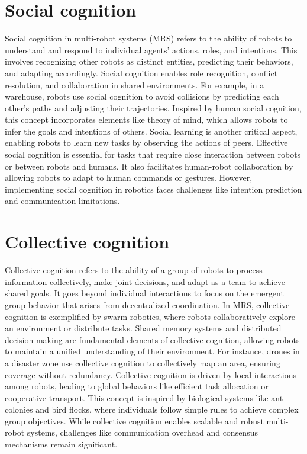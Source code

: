 \section{Social cognition}
    Social cognition in multi-robot systems (MRS) refers to the ability of robots to understand and respond to individual agents’ actions, roles, and intentions. This involves recognizing other robots as distinct entities, predicting their behaviors, and adapting accordingly. Social cognition enables role recognition, conflict resolution, and collaboration in shared environments. For example, in a warehouse, robots use social cognition to avoid collisions by predicting each other’s paths and adjusting their trajectories. Inspired by human social cognition, this concept incorporates elements like theory of mind, which allows robots to infer the goals and intentions of others. Social learning is another critical aspect, enabling robots to learn new tasks by observing the actions of peers. Effective social cognition is essential for tasks that require close interaction between robots or between robots and humans. It also facilitates human-robot collaboration by allowing robots to adapt to human commands or gestures. However, implementing social cognition in robotics faces challenges like intention prediction and communication limitations. \cite{fong-2003-a-survey-of-socially-interactive-robots}



\section{Collective cognition}
    Collective cognition refers to the ability of a group of robots to process information collectively, make joint decisions, and adapt as a team to achieve shared goals. It goes beyond individual interactions to focus on the emergent group behavior that arises from decentralized coordination. In MRS, collective cognition is exemplified by swarm robotics, where robots collaboratively explore an environment or distribute tasks. Shared memory systems and distributed decision-making are fundamental elements of collective cognition, allowing robots to maintain a unified understanding of their environment. For instance, drones in a disaster zone use collective cognition to collectively map an area, ensuring coverage without redundancy. Collective cognition is driven by local interactions among robots, leading to global behaviors like efficient task allocation or cooperative transport. This concept is inspired by biological systems like ant colonies and bird flocks, where individuals follow simple rules to achieve complex group objectives. While collective cognition enables scalable and robust multi-robot systems, challenges like communication overhead and consensus mechanisms remain significant. \cite{brambilla-2013-swarm-robotics-a-review-from-the-swarm-intelligence-perspective}

